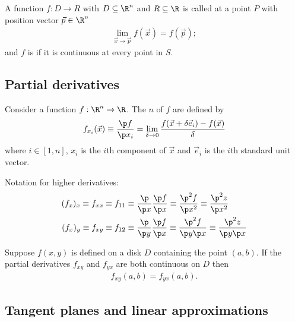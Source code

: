 \documentclass{article}
\begin{document}
\begin{definition}
    A function $f:D\to R$ with $D\subseteq\R^n$ and $R\subseteq\R$
    is called  at a point $P$ with position vector $\vec p\in \R^n$
    \begin{align*}
        \lim_{\vec x\to \vec p}f(\vec x) = f(\vec p);
    \end{align*}
    and $f$ is  if it is continuous at 
    every point in $S$.
\end{definition}


\subsection{Partial derivatives}


\begin{definition}
    Consider a function $f:\R^n\to\R$. The $n$  of
    $f$ are defined by
    \begin{align*}
        f_{x_i}(\vec x)\equiv\frac{\p f}{\p x_i}=\lim_{\delta\to 0}\frac{f(\vec x + \delta \vec e_i)-f(\vec x)}{\delta}
    \end{align*}
    where $i\in[1,n]$, $x_i$ is the $i$th component of $\vec x$ and $\vec e_i$ is the
    $i$th standard unit vector.
\end{definition}
Notation for higher derivatives:
\begin{align*}
    (f_x)_x \equiv f_{xx} \equiv f_{11} 
    &\equiv \frac{\p}{\p x}\frac{\p f}{\p x} 
    \equiv \frac{\p^2 f}{\p x^2}
    \equiv \frac{\p^2 z}{\p x^2}\\
    (f_x)_y \equiv f_{xy} \equiv f_{12} 
    &\equiv \frac{\p}{\p y}\frac{\p f}{\p x} 
    \equiv \frac{\p^2 f}{\p y \p x}
    \equiv \frac{\p^2 z}{\p y \p x}\\
\end{align*}
\begin{theorem}
    Suppose $f(x,y)$ is defined on a disk $D$ containing the point $(a,b)$.
    If the partial derivatives $f_{xy}$ and $f_{yx}$ are both continuous
    on $D$ then
    \begin{align*}
        f_{xy}(a,b)=f_{yx}(a,b).
    \end{align*}
\end{theorem}


\subsection{Tangent planes and linear approximations}
\end{document}
